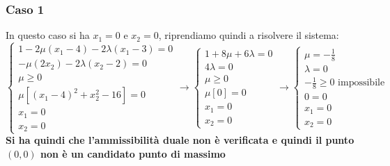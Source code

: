 \documentclass[a4paper,12pt, oneside]{book}
\begin{document}
\subsubsection{Caso 1}
In questo caso si ha $x_1=0$ e $x_2=0$, riprendiamo quindi a risolvere
il sistema:
\[\begin{cases}
    1-2\mu(x_1-4)-2\lambda(x_1-3)=0\\
    -\mu(2x_2)-2\lambda(x_2-2)=0\\
    \mu\geq 0\\
    \mu[(x_1-4)^2+x_2^2-16]=0\\
    x_1=0 \\
    x_2=0
  \end{cases}\to
  \begin{cases}
    1+8\mu+6\lambda=0\\
    4\lambda=0\\
    \mu\geq 0\\
    \mu[0]=0\\
    x_1=0 \\
    x_2=0
  \end{cases}\to
    \begin{cases}
    \mu=-\frac{1}{8}\\
    \lambda=0\\
    -\frac{1}{8}\geq 0 \mbox { impossibile}\\
    0=0\\
    x_1=0 \\
    x_2=0
  \end{cases}
\]
\textbf{Si ha quindi che l'ammissibilità duale non è verificata e quindi il
  punto $(0,0)$ non è un candidato punto di massimo}
\end{document}
